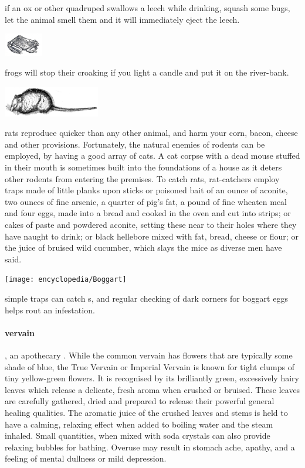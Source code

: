  if an ox or other quadruped swallows a leech while drinking, squash some bugs, let the animal smell them and it will immediately eject the leech. \localpar
\begin{center}\includegraphics[width=1.68cm]{encyclopedia/Frog}\end{center} frogs will stop their croaking if you light a candle and put it on the river-bank. \localpar
\begin{center}\includegraphics[width=4.2cm]{encyclopedia/Rat}\end{center} rats reproduce quicker than any other animal, and harm your corn, bacon, cheese and other provisions. Fortunately, the natural enemies of rodents can be employed, by having a good array of cats. A cat corpse with a dead mouse stuffed in their mouth is sometimes built into the foundations of a house as it deters other rodents from entering the premises. To catch rats, rat-catchers employ traps made of little planks upon sticks or poisoned bait of an ounce of aconite, two ounces of fine arsenic, a quarter of pig's fat, a pound of fine wheaten meal and four eggs, made into a bread and cooked in the oven and cut into strips; or cakes of paste and powdered aconite, setting these near to their holes where they have naught to drink; or black hellebore mixed with fat, bread, cheese or flour; or the juice of bruised wild cucumber, which slays the mice as diverse men have said.
\begin{center}\texttt{[image: encyclopedia/Boggart]}\end{center}\localpar {} simple traps can catch s, and regular checking of dark corners for boggart eggs helps rout an infestation. \bigparagraphendtwiddle
\paragraph{vervain},  an apothecary . While the common vervain has flowers that are typically some shade of blue, the True Vervain or Imperial Vervain is known for tight clumps of tiny yellow-green flowers. It is recognised by its brilliantly green, excessively hairy leaves which release a delicate, fresh aroma when crushed or bruised. These leaves are carefully gathered, dried and prepared to release their powerful general healing qualities. The aromatic juice of the crushed leaves and stems is held to have a calming, relaxing effect when added to boiling water and the steam inhaled. Small quantities, when mixed with soda crystals can also provide relaxing bubbles for bathing. Overuse may result in stomach ache, apathy, and a feeling of mental dullness or mild depression. 

